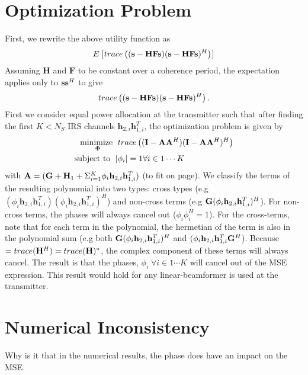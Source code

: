 \documentclass[12pt,a4paper]{report}
\begin{document}
\section{Optimization Problem}
First, we rewrite the above utility function as
	\begin{equation}
E\left[ trace\left((\mathbf{s} - \mathbf{H}\mathbf{F}\mathbf{s})(\mathbf{s} - \mathbf{H}\mathbf{F}\mathbf{s})^H \right)\right]
\end{equation}
Assuming $\mathbf{H}$ and $\mathbf{F}$ to be constant over a coherence period, the expectation applies only to $\mathbf{s} \mathbf{s}^H$ to give
	\begin{equation}
trace\left((\mathbf{s} - \mathbf{H}\mathbf{F}\mathbf{s})(\mathbf{s} - \mathbf{H}\mathbf{F}\mathbf{s})^H \right).
\end{equation}
First we consider equal power allocation at the transmitter such that after finding the first $K < N_S$ IRS channels $\mathbf{h}_{2,i}\mathbf{h}^T_{1,i}$, the optimization problem
is given by
	\begin{align}
	    \underset{\boldsymbol{\Phi}}{\text{minimize }}
	    & \; trace\left((\mathbf{I} - \mathbf{A}\mathbf{A}^H)
	   (\mathbf{I} - \mathbf{A}\mathbf{A}^H)^H \right)
	     \\
	    \text{subject to  } \; &
	    | \phi_i | = 1  \forall i \in {1 \cdots	 K}
	\end{align}
	with $\mathbf{A} = (\mathbf{G} +  \mathbf{H}_1 + \Sigma_{i=1}^{K} \phi_i \mathbf{h}_{2,i}\mathbf{h}^T_{1,i})$ (to fit on page).
	We classify the terms of the resulting polynomial into two types:
	cross types (e.g $(\phi_i \mathbf{h}_{2,i}\mathbf{h}^T_{1,i})(\phi_i \mathbf{h}_{2,i}\mathbf{h}^T_{1,i})^H$) and non-cross terms (e.g $\mathbf{G} (\phi_i \mathbf{h}_{2,i}\mathbf{h}^T_{1,i})^H$). For non-cross terms, the phases will always cancel out ($\phi_i \phi_i^H = 1$). For the cross-terms, note that
	for each term in the polynomial, the hermetian of the term is also in the polynomial sum (e.g both $\mathbf{G} (\phi_i \mathbf{h}_{2,i}\mathbf{h}^T_{1,i})^H$ and $ (\phi_i \mathbf{h}_{2,i}\mathbf{h}^T_{1,i}\mathbf{G}^H$). Because $= trace(\mathbf{H}^H) = trace(\mathbf{H})^*$, the complex component of these terms will always cancel. The result is that the phases, $\phi_i  \;\forall i \in {1 \cdots	 K}$ will cancel out of the MSE expression. This result would hold for any linear-beamformer is used at the transmitter.
\section{Numerical Inconsistency}
Why is it that in the numerical results, the phase does have an impact on the MSE.


\end{document}
